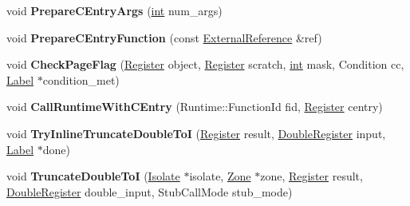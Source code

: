 \begin{DoxyCompactItemize}
void {\bfseries Prepare\+C\+Entry\+Args} (\mbox{\hyperlink{classint}{int}} num\+\_\+args)
\item 
\mbox{\label{classv8_1_1internal_1_1TurboAssembler_aeb0209406c3f6ab13fbc23af79591291}} 
void {\bfseries Prepare\+C\+Entry\+Function} (const \mbox{\hyperlink{classv8_1_1internal_1_1ExternalReference}{External\+Reference}} \&ref)
\item 
\mbox{\label{classv8_1_1internal_1_1TurboAssembler_a1fa4aee7654610ffc02bdac3ddd102c3}} 
void {\bfseries Check\+Page\+Flag} (\mbox{\hyperlink{classv8_1_1internal_1_1Register}{Register}} object, \mbox{\hyperlink{classv8_1_1internal_1_1Register}{Register}} scratch, \mbox{\hyperlink{classint}{int}} mask, Condition cc, \mbox{\hyperlink{classv8_1_1internal_1_1Label}{Label}} $\ast$condition\+\_\+met)
\item 
\mbox{\label{classv8_1_1internal_1_1TurboAssembler_a402a6ba1a950da97bcbbf500be586951}} 
void {\bfseries Call\+Runtime\+With\+C\+Entry} (Runtime\+::\+Function\+Id fid, \mbox{\hyperlink{classv8_1_1internal_1_1Register}{Register}} centry)
\item 
\mbox{\label{classv8_1_1internal_1_1TurboAssembler_af3946cf74055fd4ca6bfe32c5b1feef2}} 
void {\bfseries Try\+Inline\+Truncate\+Double\+ToI} (\mbox{\hyperlink{classv8_1_1internal_1_1Register}{Register}} result, \mbox{\hyperlink{classv8_1_1internal_1_1DoubleRegister}{Double\+Register}} input, \mbox{\hyperlink{classv8_1_1internal_1_1Label}{Label}} $\ast$done)
\item 
\mbox{\label{classv8_1_1internal_1_1TurboAssembler_ad4a35e3c684e61cd09fdb105d9457529}} 
void {\bfseries Truncate\+Double\+ToI} (\mbox{\hyperlink{classv8_1_1internal_1_1Isolate}{Isolate}} $\ast$isolate, \mbox{\hyperlink{classv8_1_1internal_1_1Zone}{Zone}} $\ast$zone, \mbox{\hyperlink{classv8_1_1internal_1_1Register}{Register}} result, \mbox{\hyperlink{classv8_1_1internal_1_1DoubleRegister}{Double\+Register}} double\+\_\+input, Stub\+Call\+Mode stub\+\_\+mode)
\item 
\mbox{\label{classv8_1_1internal_1_1TurboAssembler_ac6fa73adf3f8272b5275007ed05b1359}} 

\end{DoxyCompactItemize}
